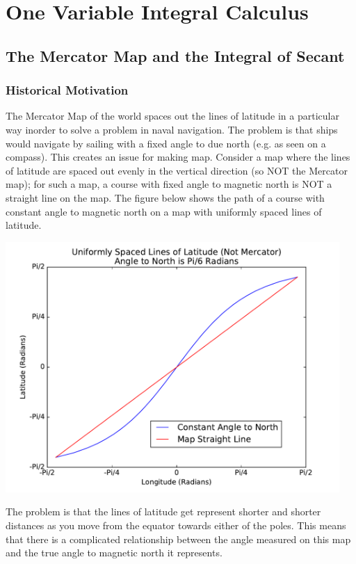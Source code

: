 \section{One Variable Integral Calculus}

\subsection{The Mercator Map and the Integral of Secant}

\subsubsection*{Historical Motivation}

The Mercator Map of the world spaces out the lines of latitude in a particular way inorder to solve a problem in naval navigation. 
The problem is that ships would navigate by sailing with a fixed angle to due north (e.g. as seen on a compass). 
This creates an issue for making map. 
Consider a map where the lines of latitude are spaced out evenly in the vertical direction (so NOT the Mercator map); for such a map, a course with fixed angle to magnetic north is NOT a straight line on the map.  
The figure below shows the path of a course with constant angle to magnetic north on a map with uniformly spaced lines of latitude.

\includegraphics[width = 5in]{oneVarIntCalc/nonMercator.pdf}

The problem is that the lines of latitude get represent shorter and shorter distances as you move from the equator towards either of the poles. 
This means that there is a complicated relationship between the angle measured on this map and the true angle to magnetic north it represents.

